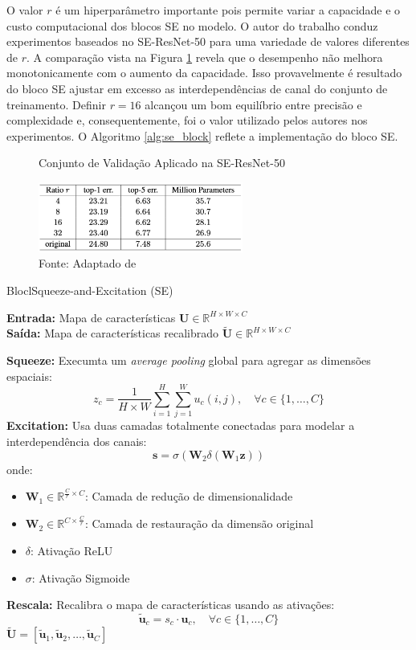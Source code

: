 O valor $r$ é um hiperparâmetro importante pois permite variar a capacidade e o custo computacional dos blocos \gls{SE} no modelo. O autor do trabalho conduz experimentos baseados no SE-ResNet-50 para uma variedade de valores diferentes de $r$. A comparação vista na Figura  \ref{fig:fig027} revela que o desempenho não melhora monotonicamente com o aumento da capacidade. Isso provavelmente é resultado do bloco SE ajustar em excesso as interdependências de canal do conjunto de treinamento. Definir $r = 16$ alcançou um bom equilíbrio entre precisão e complexidade e, consequentemente, foi o valor utilizado pelos autores nos experimentos. O Algoritmo \ref{alg:se_block} reflete a implementação do bloco \gls{SE}.

\begin{figure}[h!]
    \centering
    \caption{Conjunto de Validação Aplicado na SE-ResNet-50}
    \includegraphics[width=0.6\textwidth]{figures/fig027.png}
    \caption*{Fonte: Adaptado de \cite{huSqueezeandExcitationNetworks2018}}
    \label{fig:fig027}
\end{figure}

\begin{algorithm}
\caption{BloclSqueeze-and-Excitation (SE)}
\label{alg:se_block}
\textbf{Entrada:} Mapa de características $\mathbf{U} \in \mathbb{R}^{H \times W \times C}$\\
\textbf{Saída:} Mapa de características recalibrado $\tilde{\mathbf{U}} \in \mathbb{R}^{H \times W \times C}$
\begin{algorithmic}[1]
\STATE \textbf{Squeeze:} Execumta um \textit{average pooling} global para agregar as dimensões espaciais:
\[
z_c = \frac{1}{H \times W} \sum_{i=1}^H \sum_{j=1}^W u_c(i, j), \quad \forall c \in \{1, \dots, C\}
\]
\STATE \textbf{Excitation:} Usa duas camadas totalmente conectadas para modelar a interdependência dos canais:
\[
\mathbf{s} = \sigma(\mathbf{W}_2 \delta(\mathbf{W}_1 \mathbf{z}))
\]
onde:
\begin{itemize}
    \item $\mathbf{W}_1 \in \mathbb{R}^{\frac{C}{r} \times C}$: Camada de redução de dimensionalidade
    \item $\mathbf{W}_2 \in \mathbb{R}^{C \times \frac{C}{r}}$: Camada de restauração da dimensão original
    \item $\delta$: Ativação ReLU
    \item $\sigma$: Ativação Sigmoide
\end{itemize}
\STATE \textbf{Rescala:} Recalibra o mapa de características usando as ativações:
\[
\tilde{\mathbf{u}}_c = s_c \cdot \mathbf{u}_c, \quad \forall c \in \{1, \dots, C\}
\]
\RETURN $\tilde{\mathbf{U}} = [\tilde{\mathbf{u}}_1, \tilde{\mathbf{u}}_2, \dots, \tilde{\mathbf{u}}_C]$
\end{algorithmic}
\end{algorithm}


